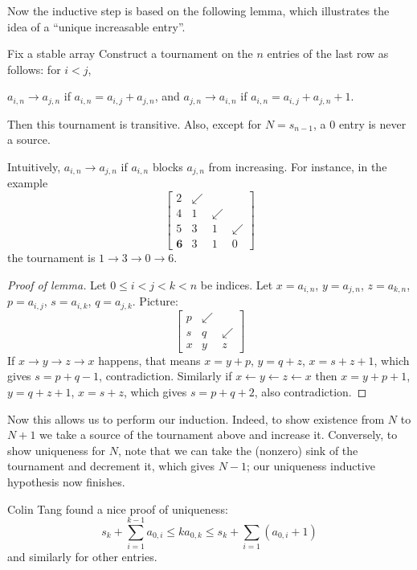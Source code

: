 \documentclass[11pt]{scrartcl}
\begin{document}
Now the inductive step is based on the following lemma,
which illustrates the idea of a ``unique increasable entry''.
\begin{lemma*}
  Fix a stable array
  Construct a tournament on the $n$ entries
  of the last row as follows: for $i < j$,
  \begin{itemize}
    \ii $a_{i,n} \to a_{j,n}$
    if $a_{i,n} = a_{i,j} + a_{j,n}$, and
    \ii $a_{j,n} \to a_{i,n}$
    if $a_{i,n} = a_{i,j} + a_{j,n} + 1$.
  \end{itemize}
  Then this tournament is transitive.
  Also, except for $N = s_{n-1}$, a $0$ entry is never a source.
\end{lemma*}
Intuitively, $a_{i,n} \to a_{j,n}$
if $a_{i,n}$ blocks $a_{j,n}$ from increasing.
For instance, in the example
\[
  \begin{bmatrix}
    2 & \swarrow \\
    4 & 1 & \swarrow \\
    5 & 3 & 1 & \swarrow \\
    \mathbf 6 & 3 & 1 & 0
  \end{bmatrix}
\]
the tournament is $1 \to 3 \to 0 \to 6$.
\begin{proof}
  [Proof of lemma]
  Let $0 \le i < j < k < n$ be indices.
  Let $x = a_{i,n}$, $y = a_{j,n}$, $z = a_{k,n}$,
  $p = a_{i,j}$, $s = a_{i,k}$, $q = a_{j,k}$. Picture:
  \[
    \begin{bmatrix}
      p & \swarrow \\
      s & q & \swarrow \\
      x & y & z
    \end{bmatrix}
  \]
  If $x \to y \to z \to x$ happens, that means
  $x = y+p$, $y = q+z$, $x = s+z+1$,
  which gives $s=p+q-1$, contradiction.
  Similarly if $x \leftarrow y \leftarrow z \leftarrow x$ then
  $x = y+p+1$, $y = q+z+1$, $x = s+z$,
  which gives $s=p+q+2$, also contradiction.
\end{proof}

Now this allows us to perform our induction.
Indeed, to show existence from $N$ to $N+1$
we take a source of the tournament above and increase it.
Conversely, to show uniqueness for $N$,
note that we can take the (nonzero) sink of the tournament and decrement it,
which gives $N-1$; our uniqueness inductive hypothesis now finishes.

\begin{remark*}
  Colin Tang found a nice proof of uniqueness:
  \[
    s_k + \sum_{i=1}^{k-1} a_{0,i} \le ka_{0,k}
    \le s_k + \sum_{i=1} \left( a_{0,i} + 1 \right)
  \]
  and similarly for other entries.
\end{remark*}
\pagebreak
\end{document}
